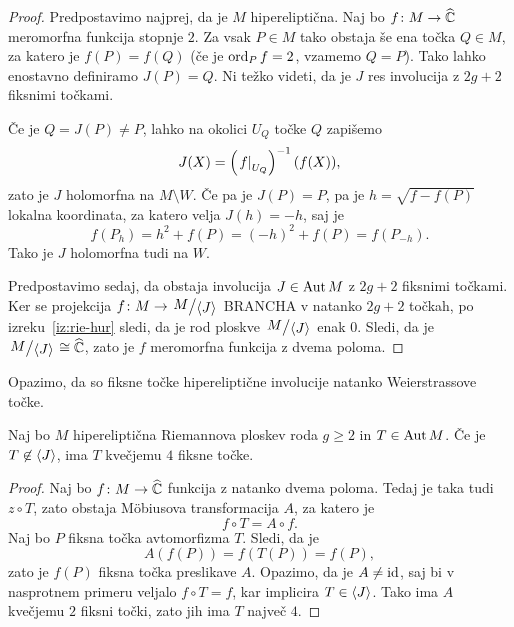 \begin{proof}
Predpostavimo najprej, da je $M$ hipereliptična. Naj bo
$f \colon M \to \widehat{\mathbb{C}}$ meromorfna funkcija stopnje $2$. Za vsak
$P \in M$ tako obstaja še ena točka $Q \in M$, za katero je
$f(P) = f(Q)$ (če je $\operatorname{ord}_P f = 2$, vzamemo $Q=P$). Tako lahko
enostavno definiramo $J(P) = Q$. Ni težko videti, da je $J$
res involucija z $2g + 2$ fiksnimi točkami.

Če je $Q = J(P) \ne P$, lahko na okolici $U_Q$ točke $Q$ zapišemo
\[
J(X) = \left(\left. f\right|_{U_Q}^{}\right)^{-1}(f(X)),
\]
zato je $J$ holomorfna na $M \setminus W$. Če pa je $J(P) = P$, pa
je $h = \sqrt{f - f(P)}$ lokalna koordinata, za katero velja
$J(h) = -h$, saj je
\[
f(P_h) = h^2 + f(P) = (-h)^2 + f(P) = f(P_{-h}).
\]
Tako je $J$ holomorfna tudi na $W$.

Predpostavimo sedaj, da obstaja involucija $J \in \operatorname{Aut} M$ z
$2g + 2$ fiksnimi točkami. Ker se projekcija
$f \colon M \to \kvoc{M}{\skl{J}}$ BRANCHA v natanko $2g + 2$
točkah, po izreku~\ref{iz:rie-hur} sledi, da je rod ploskve
$\kvoc{M}{\skl{J}}$ enak $0$. Sledi, da je
$\kvoc{M}{\skl{J}} \cong \rs$, zato je $f$ meromorfna funkcija z
dvema poloma.
\end{proof}


Opazimo, da so fiksne točke hipereliptične involucije natanko
Weierstrassove točke.

\begin{trditev}
Naj bo $M$ hipereliptična Riemannova ploskev roda $g \geq 2$ in
$T \in \operatorname{Aut} M$. Če je $T \not \in \left\langle J\right\rangle$, ima $T$ kvečjemu $4$
fiksne točke.
\end{trditev}

\begin{proof}
Naj bo $f \colon M \to \widehat{\mathbb{C}}$ funkcija z natanko dvema poloma. Tedaj
je taka tudi $z \circ T$, zato obstaja Möbiusova transformacija
$A$, za katero je
\[
f \circ T = A \circ f.
\]
Naj bo $P$ fiksna točka avtomorfizma $T$. Sledi, da je
\[
A(f(P)) = f(T(P)) = f(P),
\]
zato je $f(P)$ fiksna točka preslikave $A$. Opazimo, da je
$A \ne \operatorname{id}$, saj bi v nasprotnem primeru veljalo $f \circ T = f$,
kar implicira $T \in \left\langle J\right\rangle$. Tako ima $A$ kvečjemu $2$ fiksni
točki, zato jih ima $T$ največ $4$.
\end{proof}

